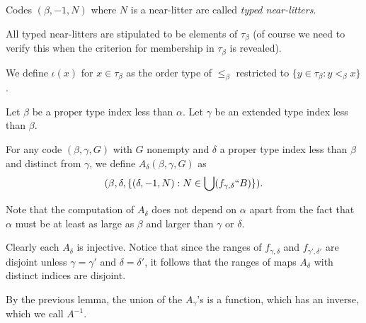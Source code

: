 \begin{definition}
\label {def:typed-near-litter}
Codes $(\beta,-1,N)$ where $N$ is a near-litter are called {\em typed near-litters\/}.
\end{definition}

\begin{lemma}
\label {lem:near-litter-code}
All typed near-litters are stipulated to be elements of $\tau_\beta$ (of course we need to verify this when the criterion for membership in $\tau_\beta$ is revealed).
\end{lemma}

\begin{definition}
\label {def:iota}
We define $\iota(x)$ for $x \in \tau_\beta$ as the order type of $\leq_\beta$ restricted to $\{y \in \tau_\beta:y <_\beta x\}$.
\end{definition}

\begin{definition}
\label {def:alt-ext}
Let $\beta$ be a proper type index less than $\alpha$.  Let $\gamma$ be an extended type index less than $\beta$.

For any code $(\beta,\gamma,G)$ with $G$ nonempty and $\delta$ a proper type index less than $\beta$ and distinct from $\gamma$, we define
$A_\delta(\beta,\gamma,G)$ as $$(\beta,\delta,\{(\delta,-1,N):N \in \bigcup (f_{\gamma,\delta}``B)\}).$$

Note that the computation of $A_\delta$ does not depend on $\alpha$ apart from the fact that $\alpha$ must be at least as large as $\beta$ and larger than $\gamma$ or $\delta$.
\end{definition}

\begin{lemma}
\label {lem:alt-ext-nature}
Clearly each $A_\delta$ is injective.  Notice that since the ranges of $f_{\gamma,\delta}$ and $f_{\gamma',\delta'}$ are disjoint unless $\gamma=\gamma'$ and $\delta=\delta'$, it follows that the ranges of
maps $A_\delta$ with distinct indices are disjoint.
\end{lemma}

\begin{definition}
\label {def:ainverse}
By the previous lemma, the union of the $A_\gamma$'s is a function, which has an inverse, which we call $A^{-1}$.
\end{definition}

